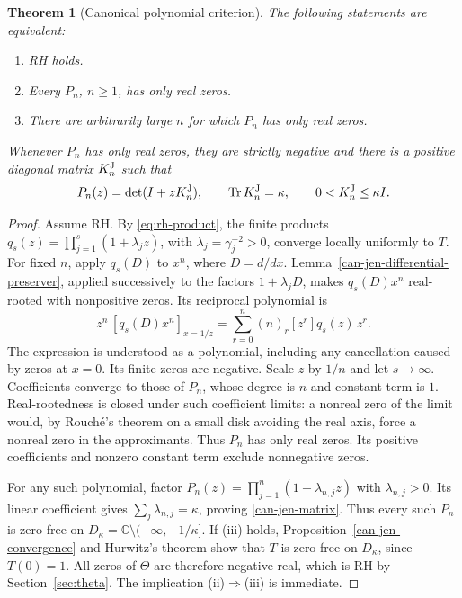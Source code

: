 \documentclass[11pt,a4paper]{article}
\numberwithin{equation}{section}
\newtheorem{theorem}{Theorem}[section]
\theoremstyle{definition}
\theoremstyle{remark}
\newcommand{\C}{\mathbb C}
\DeclareMathOperator{\Tr}{Tr}
\begin{document}
\begin{theorem}[Canonical polynomial criterion]\label{can-jen-criterion}
The following statements are equivalent:
\begin{enumerate}[label=(\roman*),leftmargin=2.2em]
\item RH holds.
\item Every $P_n$, $n\geq1$, has only real zeros.
\item There are arbitrarily large $n$ for which $P_n$ has only real zeros.
\end{enumerate}
Whenever $P_n$ has only real zeros, they are strictly negative and
there is a positive diagonal matrix $K_n^{\rm J}$ such that
\begin{equation}\label{can-jen-matrix}
 P_n(z)=\det(I+zK_n^{\rm J}),\qquad
 \Tr K_n^{\rm J}=\kappa,\qquad
 0<K_n^{\rm J}\leq\kappa I.
\end{equation}
\end{theorem}
\begin{proof}
Assume RH. By \eqref{eq:rh-product}, the finite products
$q_s(z)=\prod_{j=1}^{s}(1+\lambda_jz)$, with
$\lambda_j=\gamma_j^{-2}>0$, converge locally uniformly to $T$.
For fixed $n$, apply $q_s(D)$ to $x^n$, where $D=d/dx$.
Lemma~\ref{can-jen-differential-preserver}, applied successively
to the factors $1+\lambda_jD$, makes $q_s(D)x^n$ real-rooted
with nonpositive zeros. Its reciprocal polynomial is
\[
 z^n\,[q_s(D)x^n]_{x=1/z}
   =\sum_{r=0}^{n}(n)_r[z^r]q_s(z)\,z^r.
\]
The expression is understood as a polynomial, including any cancellation
caused by zeros at $x=0$. Its finite zeros are negative. Scale $z$ by
$1/n$ and let $s\to\infty$. Coefficients converge to those of $P_n$,
whose degree is $n$ and constant term is $1$. Real-rootedness is closed
under such coefficient limits: a nonreal zero of the limit would, by
Rouch\'e's theorem on a small disk avoiding the real axis, force a nonreal
zero in the approximants. Thus $P_n$ has only real zeros. Its positive
coefficients and nonzero constant term exclude nonnegative zeros.

For any such polynomial, factor
$P_n(z)=\prod_{j=1}^{n}(1+\lambda_{n,j}z)$ with
$\lambda_{n,j}>0$. Its linear coefficient gives
$\sum_j\lambda_{n,j}=\kappa$, proving \eqref{can-jen-matrix}.
Thus every such $P_n$ is zero-free on
$D_\kappa=\C\setminus(-\infty,-1/\kappa]$.
If (iii) holds, Proposition~\ref{can-jen-convergence} and Hurwitz's
theorem show that $T$ is zero-free on $D_\kappa$, since $T(0)=1$.
All zeros of $\Theta$ are therefore negative real, which is RH by
Section~\ref{sec:theta}. The implication (ii)$\Rightarrow$(iii) is immediate.
\end{proof}
\end{document}
